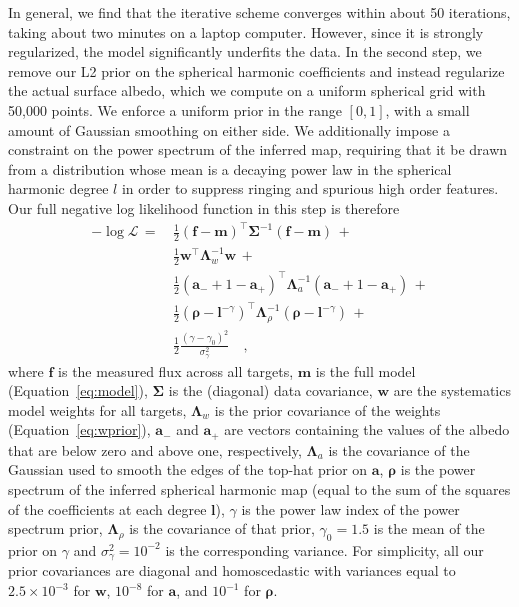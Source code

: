 \documentclass[modern]{aastex62}
\begin{document}
In general, we find that the iterative scheme converges within about 50 
iterations, taking about two minutes on a laptop computer. However, since it 
is strongly regularized, the model significantly
underfits the data. In the second step, we remove our L2 prior on the spherical
harmonic coefficients and instead regularize the actual surface albedo, which
we compute on a uniform spherical grid with 50,000 points. We enforce a 
uniform prior in the range $[0, 1]$, with a small amount of Gaussian smoothing on either 
side. We additionally impose a constraint on the power spectrum of the
inferred map, requiring that it be drawn from a distribution whose mean
is a decaying power law in the spherical harmonic degree $l$ in order
to suppress ringing and spurious high order features.
Our full negative log likelihood function in this step is therefore
%
\begin{align}
    \label{eq:nll}
    -\log\mathcal{L} \, = \, 
        &\frac{1}{2}(\mathbf{f} - \mathbf{m})^\top \boldsymbol{\Sigma}^{-1} (\mathbf{f} - \mathbf{m}) \, + \nonumber \\
        &\frac{1}{2}\mathbf{w}^\top \boldsymbol{\Lambda}_w^{-1} \mathbf{w} \, + \nonumber \\
        &\frac{1}{2}(\mathbf{a_-} + 1 - \mathbf{a_+})^\top \boldsymbol{\Lambda}_a^{-1} (\mathbf{a_-} + 1 - \mathbf{a_+}) \, + \nonumber \\
        &\frac{1}{2}(\boldsymbol{\rho} - \boldsymbol{l}^{-\gamma})^\top \boldsymbol{\Lambda}_\rho^{-1} (\boldsymbol{\rho} - \boldsymbol{l}^{-\gamma}) \, + \nonumber \\
        &\frac{1}{2} \frac{(\gamma - \gamma_0)^2}{\sigma_\gamma^2}
        \quad,
\end{align}
%
where $\mathbf{f}$ is the measured flux across all targets,
$\mathbf{m}$ is the full model (Equation~\ref{eq:model}),
$\boldsymbol{\Sigma}$ is the (diagonal) data covariance, 
$\mathbf{w}$ are the systematics model weights for all targets,
$\boldsymbol{\Lambda}_w$ is the prior covariance of the weights
(Equation~\ref{eq:wprior}), $\mathbf{a_-}$ and $\mathbf{a_+}$ are
vectors containing the values of the albedo that are below zero and above one, 
respectively, $\boldsymbol{\Lambda}_a$ is the covariance of the Gaussian
used to smooth the edges of the top-hat prior on $\mathbf{a}$,
$\boldsymbol{\rho}$ is the power spectrum of the inferred spherical harmonic map
(equal to the sum of the squares of the coefficients at each degree $\boldsymbol{l}$),
$\gamma$ is the power law index of the power spectrum prior, $\boldsymbol{\Lambda}_\rho$ is the
covariance of that prior, $\gamma_0 = 1.5$ is the mean of the prior on $\gamma$
and $\sigma_\gamma^2 = 10^{-2}$ is the corresponding variance.
%
For simplicity, all our prior covariances are diagonal and
homoscedastic with variances equal to $2.5\times 10^{-3}$ for $\mathbf{w}$,
$10^{-8}$ for $\mathbf{a}$, and $10^{-1}$ for $\boldsymbol{\rho}$.
\end{document}
